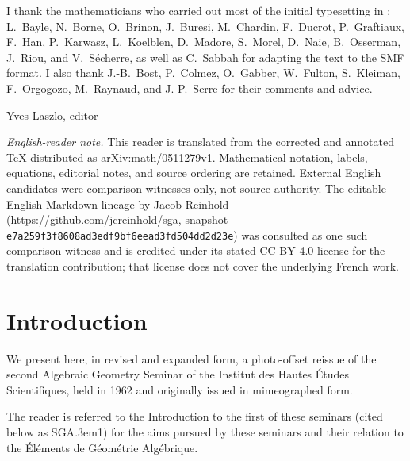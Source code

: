 \documentclass[11pt,a4paper,oneside]{book}
\providecommand{\sisi}[2]{#2}
\providecommand{\pageoriginale}{%
  \refstepcounter{pageoriginal}%
  \marginpar{\raggedright\footnotesize\bfseries\thepageoriginal}%
  \xspace}
\providecommand{\SGA}{\textup{SGA}\kern.3em}
\theoremstyle{plain}
\theoremstyle{definition}
\theoremstyle{remark}
\begin{document}
I thank the mathematicians who carried out most of the initial typesetting
in \LaTeXe: L.~Bayle, N.~Borne, O.~Brinon, J.~Buresi, M.~Chardin,
F.~Ducrot, P.~Graftiaux, F.~Han, P.~Karwasz, L.~Koelblen, D.~Madore,
S.~Morel, D.~Naie, B.~Osserman, J.~Riou, and V.~S\'echerre, as well as
C.~Sabbah for adapting the text to the SMF format. I also thank J.-B.~Bost,
P.~Colmez, O.~Gabber, W.~Fulton, S.~Kleiman, F.~Orgogozo, M.~Raynaud, and
J.-P.~Serre for their comments and advice.

\begin{flushright}
Yves Laszlo, editor
\end{flushright}

\medskip
\noindent\textit{English-reader note.} This reader is translated from the
corrected and annotated TeX distributed as arXiv:math/0511279v1. Mathematical
notation, labels, equations, editorial notes, and source ordering are retained.
External English candidates were comparison witnesses only, not source
authority. The editable English Markdown lineage by Jacob Reinhold
(\url{https://github.com/jcreinhold/sga}, snapshot
\texttt{e7a259f3f8608ad3edf9bf6eead3fd504dd2d23e}) was consulted as one such
comparison witness and is credited under its stated CC BY 4.0 license for
the translation contribution; that license does not cover the underlying
French work.

\cleardoublepage
\tableofcontents

\mainmatter
\chapter*{Introduction} \label{I.0}

We\pageoriginale present here, in revised and expanded form, a photo-offset
reissue of the second \sisi{ALGEBRAIC GEOMETRY SEMINAR of the INSTITUT
DES HAUTES \'ETUDES SCIENTIFIQUES}{Algebraic Geometry Seminar of the
Institut des Hautes \'Etudes Scientifiques}, held in 1962 and originally
issued in mimeographed form.

The reader is referred to the Introduction to the first of these seminars
(cited below as \SGA 1) for the aims pursued by these seminars and their
relation to the \sisi{\'EL\'EMENTS DE G\'{E}OM\'ETRIE
ALG\'EBRIQUE}{\'El\'ements de G\'eom\'etrie Alg\'ebrique}.
\end{document}
